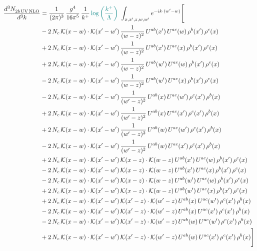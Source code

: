 \documentclass[9pt]{article}
\numberwithin{equation}{section}
\begin{document}
\begin{align}
\frac{d^{3}N_{2b\,\rm UV\, NLO}^{\rm}}{d^{3}k} & = \frac{1}{(2\pi)^{3}}\,\frac{g^{4}}{16\pi^{5}}\,\frac{1}{k^{+}}\,{\color{teal}\log{\left(\frac{k^{+}}{\Lambda}\right)}}\,\,\int_{x,x',z,w,w'}e^{-ik\cdot(w'-w)}\Bigg[\notag\\ & -2\,N_{c}\,\mathcal{K}(x-w)\cdot\mathcal{K}(x'-w')\,\frac{1}{(w-z)^{2}}\,U^{ab}(x')\,U^{ac}(w)\,\rho^{b}(x')\,\rho^{c}(x)\notag\\
&+2\,N_{c}\,\mathcal{K}(x-w)\cdot\mathcal{K}(x'-w')\,\frac{1}{(w-z)^{2}}\,U^{ab}(x')\,U^{ac}(x)\,\rho^{b}(x')\,\rho^{c}(x)\notag\\
&+2\,N_{c}\,\mathcal{K}(x-w)\cdot\mathcal{K}(x'-w')\,\frac{1}{(w-z)^{2}}\,U^{ab}(w')\,U^{ac}(w)\,\rho^{b}(x')\,\rho^{c}(x)\notag\\
&-2\,N_{c}\,\mathcal{K}(x-w)\cdot\mathcal{K}(x'-w')\,\frac{1}{(w-z)^{2}}\,U^{ab}(w')\,U^{ac}(x)\,\rho^{b}(x')\,\rho^{c}(x)\notag\\
&-2\,N_{c}\,\mathcal{K}(x-w)\cdot\mathcal{K}(x'-w')\,\frac{1}{(w'-z)^{2}}\,U^{ab}(x)\,U^{ac}(w')\,\rho^{c}(x')\,\rho^{b}(x)\notag\\
&+2\,N_{c}\,\mathcal{K}(x-w)\cdot\mathcal{K}(x'-w')\,\frac{1}{(w'-z)^{2}}\,U^{ab}(x)\,U^{ac}(x')\,\rho^{c}(x')\,\rho^{b}(x)\notag\\
&+2\,N_{c}\,\mathcal{K}(x-w)\cdot\mathcal{K}(x'-w')\,\frac{1}{(w'-z)^{2}}\,U^{ab}(w)\,U^{ac}(w')\,\rho^{c}(x')\,\rho^{b}(x)\notag\\
&-2\,N_{c}\,\mathcal{K}(x-w)\cdot\mathcal{K}(x'-w')\,\frac{1}{(w'-z)^{2}}\,U^{ab}(w)\,U^{ac}(x')\,\rho^{c}(x')\,\rho^{b}(x)\notag\\
&+2\,N_{c}\,\mathcal{K}(x-w)\cdot\mathcal{K}(x'-w')\,\mathcal{K}(x-z)\cdot\mathcal{K}(w-z)\,U^{ab}(x')\,U^{ac}(w)\,\rho^{b}(x')\,\rho^{c}(x)\notag\\
&-2\,N_{c}\,\mathcal{K}(x-w)\cdot\mathcal{K}(x'-w')\,\mathcal{K}(x-z)\cdot\mathcal{K}(w-z)\,U^{ab}(x')\,U^{ac}(x)\,\rho^{b}(x')\,\rho^{c}(x)\notag\\
&-2\,N_{c}\,\mathcal{K}(x-w)\cdot\mathcal{K}(x'-w')\,\mathcal{K}(x-z)\cdot\mathcal{K}(w-z)\,U^{ab}(w')\,U^{ac}(w)\,\rho^{b}(x')\,\rho^{c}(x)\notag\\
&+2\,N_{c}\,\mathcal{K}(x-w)\cdot\mathcal{K}(x'-w')\,\mathcal{K}(x-z)\cdot\mathcal{K}(w-z)\,U^{ab}(w')\,U^{ac}(x)\,\rho^{b}(x')\,\rho^{c}(x)\notag\\
&+2\,N_{c}\,\mathcal{K}(x-w)\cdot\mathcal{K}(x'-w')\,\mathcal{K}(x'-z)\cdot\mathcal{K}(w'-z)\,U^{ab}(x)\,U^{ac}(w')\,\rho^{c}(x')\,\rho^{b}(x)\notag\\
&-2\,N_{c}\,\mathcal{K}(x-w)\cdot\mathcal{K}(x'-w')\,\mathcal{K}(x'-z)\cdot\mathcal{K}(w'-z)\,U^{ab}(x)\,U^{ac}(x')\,\rho^{c}(x')\,\rho^{b}(x)\notag\\
&-2\,N_{c}\,\mathcal{K}(x-w)\cdot\mathcal{K}(x'-w')\,\mathcal{K}(x'-z)\cdot\mathcal{K}(w'-z)\,U^{ab}(w)\,U^{ac}(w')\,\rho^{c}(x')\,\rho^{b}(x)\notag\\
&+2\,N_{c}\,\mathcal{K}(x-w)\cdot\mathcal{K}(x'-w')\,\mathcal{K}(x'-z)\cdot\mathcal{K}(w'-z)\,U^{ab}(w)\,U^{ac}(x')\,\rho^{c}(x')\,\rho^{b}(x)\Bigg]
\end{align}
\end{document}
